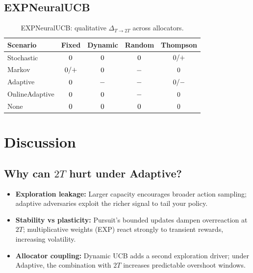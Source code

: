 \documentclass[11pt,a4paper]{article}
\newcommand{\critical}[1]{\textcolor{criticalcolor}{\textbf{#1}}}
\newcommand{\success}[1]{\textcolor{successcolor}{\textbf{#1}}}
\begin{document}
\subsection{EXPNeuralUCB}
\begin{table}[H]
\centering
\scriptsize
\begin{tabular}{lcccc}
\toprule
\textbf{Scenario} & \textbf{Fixed} & \textbf{Dynamic} & \textbf{Random} & \textbf{Thompson} \\
\midrule
Stochastic & ${\small 0}$ & ${\small 0}$ & ${\small 0}$ & ${\small 0/+}$ \\
Markov & \success{${\small 0/+}$} & ${\small 0}$ & \critical{${\small -}$} & ${\small 0}$ \\
Adaptive & ${\small 0}$ & \critical{${\small -}$} & \critical{${\small -}$} & ${\small 0/-}$ \\
OnlineAdaptive & ${\small 0}$ & ${\small 0}$ & \critical{${\small -}$} & ${\small 0}$ \\
None & ${\small 0}$ & ${\small 0}$ & ${\small 0}$ & ${\small 0}$ \\
\bottomrule
\end{tabular}
\caption{EXPNeuralUCB: qualitative $\Delta_{T\rightarrow 2T}$ across allocators.}
\end{table}

\section{Discussion}

\subsection{Why can $2T$ hurt under Adaptive?}
\begin{itemize}
    \item \textbf{Exploration leakage:} Larger capacity encourages broader action sampling; adaptive adversaries exploit the richer signal to tail your policy.
    \item \textbf{Stability vs plasticity:} Pursuit's bounded updates dampen overreaction at $2T$; multiplicative weights (EXP) react strongly to transient rewards, increasing volatility.
    \item \textbf{Allocator coupling:} Dynamic UCB adds a second exploration driver; under Adaptive, the combination with $2T$ increases predictable overshoot windows.
\end{itemize}
\end{document}
